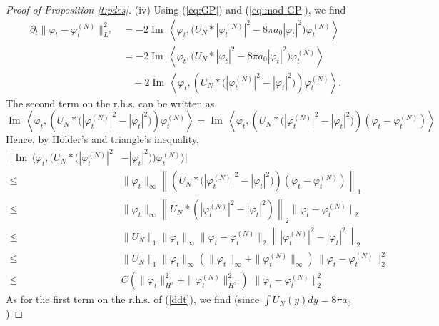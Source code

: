 \documentclass[11pt,a4paper]{article}
\renewcommand{\Im}{\operatorname{Im}\,} 	%
\begin{document}
\begin{proof}[Proof of Proposition \ref{t:pdes}]
(iv) Using (\ref{eq:GP}) and (\ref{eq:mod-GP}), we find
\begin{equation}\label{ddt}
    \begin{aligned}
      \partial_t \| \varphi_t - \varphi_t^{(N)} \|_{L^2}^2 & = -2 \Im \left\langle
      \varphi_t, \big(U_N * |\varphi_t^{(N)}|^2 - 8 \pi a_0 |\varphi_t|^2\big)
      \varphi_t^{(N)} \right\rangle \\
      & = - 2 \Im \left\langle \varphi_t, \big(U_N * |\varphi_t|^2 - 8 \pi a_0
      |\varphi_t|^2\big) \varphi_t^{(N)} \right\rangle \\
      & \quad - 2 \Im \left\langle \varphi_t, \left( U_N * \big(|\varphi_t^{(N)}|^2 -
      |\varphi_t|^2\big) \right) \varphi_t^{(N)} \right\rangle.
    \end{aligned}
  \end{equation}
The second term on the r.h.s. can be written as
\[  \Im \left\langle \varphi_t, \left( U_N * \big(|\varphi_t^{(N)}|^2 -
      |\varphi_t|^2\big) \right) \varphi_t^{(N)} \right\rangle = \Im \left\langle \varphi_t, \left( U_N * \big(|\varphi_t^{(N)}|^2 -  |\varphi_t|^2\big) \right) (\varphi_t - \varphi_t^{(N)}) \right\rangle \]
 Hence, by H\"older's and triangle's inequality, 
\begin{equation}\label{ddt-2} \begin{split} 
\Big|  \Im \Big\langle \varphi_t, \Big( U_N * \big(|\varphi_t^{(N)}|^2 &-
      |\varphi_t|^2\big) \Big) \varphi_t^{(N)} \Big\rangle \Big| \\ \leq \; & \| \varphi_t \|_\infty \left\| \left( U_N * \big(|\varphi_t^{(N)}|^2 -  |\varphi_t|^2\big) \right) (\varphi_t - \varphi_t^{(N)}) \right\|_1 \\ \leq \; & 
  \| \varphi_t \|_\infty  \left\| U_N * (|\varphi_t^{(N)}|^2 - |\varphi_t|^2 )\right\|_2 \| \varphi_t - \varphi_t^{(N)} \|_2 \\ \leq \; & \| U_N \|_1 \| \varphi_t \|_\infty \| \varphi_t - \varphi_t^{(N)} \|_2  \left\| |\varphi_t^{(N)}|^2 - |\varphi_t|^2 \right\|_2 \\ \leq \; &  \| U_N \|_1 \| \varphi_t \|_\infty \left( \| \varphi_t \|_\infty + \| \varphi_t^{(N)} \|_\infty \right) \,  \| \varphi_t - \varphi_t^{(N)} \|^2_2 \\ \leq \; & C  \left( \| \varphi_t \|^2_{H^2} + \| \varphi_t^{(N)}  \|^2_{H^2}  \right) \, \,  \| \varphi_t - \varphi_t^{(N)} \|^2_2
\end{split} \end{equation}
As for the first term on the r.h.s. of (\ref{ddt}), we find (since $\int U_N (y) dy = 8 \pi a_0$) 

\end{proof}
\end{document}
